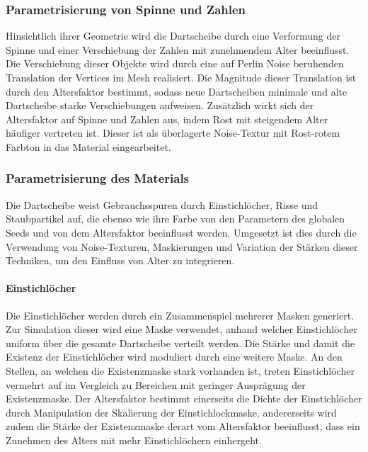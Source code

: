 \subsubsection{Parametrisierung von Spinne und Zahlen}

Hinsichtlich ihrer Geometrie wird die Dartscheibe durch eine Verformung der Spinne und einer Verschiebung der Zahlen mit zunehmendem Alter beeinflusst. Die Verschiebung dieser Objekte wird durch eine auf Perlin Noise beruhenden Translation der Vertices im Mesh realisiert. Die Magnitude dieser Translation ist durch den Altersfaktor bestimmt, sodass neue Dartscheiben minimale und alte Dartscheibe starke Verschiebungen aufweisen. Zusätzlich wirkt sich der Altersfaktor auf Spinne und Zahlen aus, indem Rost mit steigendem Alter häufiger vertreten ist. Dieser ist als überlagerte Noise-Textur mit Rost-rotem Farbton in das Material eingearbeitet.

\subsubsection{Parametrisierung des Materials}

Die Dartscheibe weist Gebrauchsspuren durch Einstichlöcher, Risse und Staubpartikel auf, die ebenso wie ihre Farbe von den Parametern des globalen Seeds und von dem Altersfaktor beeinflusst werden. Umgesetzt ist dies durch die Verwendung von Noise-Texturen, Maskierungen und Variation der Stärken dieser Techniken, um den Einfluss von Alter zu integrieren.

\paragraph{Einstichlöcher}

Die Einstichlöcher werden durch ein Zusammenspiel mehrerer Masken generiert. Zur Simulation dieser wird eine Maske verwendet, anhand welcher Einstichlöcher uniform über die gesamte Dartscheibe verteilt werden. Die Stärke und damit die Existenz der Einstichlöcher wird moduliert durch eine weitere Maske. An den Stellen, an welchen die Existenzmaske stark vorhanden ist, treten Einstichlöcher vermehrt auf im Vergleich zu Bereichen mit geringer Ausprägung der Existenzmaske. Der Altersfaktor bestimmt einerseits die Dichte der Einstichlöcher durch Manipulation der Skalierung der Einstichlockmaske, andererseits wird zudem die Stärke der Existenzmaske derart vom Altersfaktor beeinflusst, dass ein Zunehmen des Alters mit mehr Einstichlöchern einhergeht.

